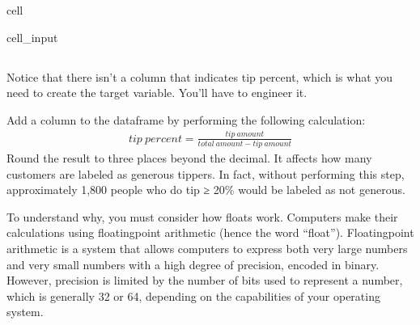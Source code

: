 \documentclass[letterpaper,10pt,english]{sphinxmanual}
\begin{document}
\begin{sphinxuseclass}{cell}
\begin{sphinxuseclass}{cell_input}
\begin{sphinxVerbatim}[commandchars=\\\{\}]
  \PYG{p}{[}\PYG{p}{[}\PYG{p}{]}  \PYG{p}{]}
\end{sphinxVerbatim}

\end{sphinxuseclass}
\end{sphinxuseclass}

\subsection{}
\label{\detokenize{Automatidata_Machine Learning:target}}
\sphinxAtStartPar
Notice that there isn’t a column that indicates tip percent, which is what you need to create the target variable. You’ll have to engineer it.

\sphinxAtStartPar
Add a  column to the dataframe by performing the following calculation:\\

\begin{equation*}
\begin{split}tip\ percent = \frac{tip\ amount}{total\ amount - tip\ amount}\end{split}
\end{equation*}
\sphinxAtStartPar
Round the result to three places beyond the decimal.  It affects how many customers are labeled as generous tippers. In fact, without performing this step, approximately 1,800 people who do tip ≥ 20\% would be labeled as not generous.

\sphinxAtStartPar
To understand why, you must consider how floats work. Computers make their calculations using floating\sphinxhyphen{}point arithmetic (hence the word “float”). Floating\sphinxhyphen{}point arithmetic is a system that allows computers to express both very large numbers and very small numbers with a high degree of precision, encoded in binary. However, precision is limited by the number of bits used to represent a number, which is generally 32 or 64, depending on the capabilities of your operating system.
\end{document}
